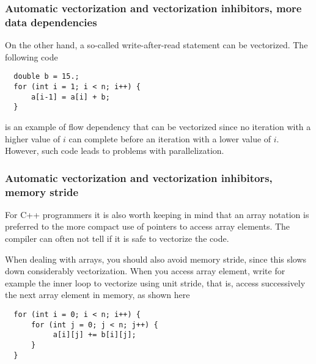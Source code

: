 \documentclass{beamer}
\begin{document}
\begin{frame}
\frametitle{Automatic vectorization and vectorization inhibitors, more data dependencies}

On the other hand,  a so-called 
write-after-read statement can be vectorized. The following code
\begin{verbatim}
  double b = 15.;
  for (int i = 1; i < n; i++) {
      a[i-1] = a[i] + b;
  }
\end{verbatim}
is an example of flow dependency that can be vectorized since no iteration with a higher value of $i$
can complete before an iteration with a lower value of $i$. However, such code leads to problems with parallelization.
\end{frame}

\begin{frame}
\frametitle{Automatic vectorization and vectorization inhibitors, memory stride}

For C++ programmers  it is also worth keeping in mind that an array notation is preferred to the more compact use of pointers to access array elements. The compiler can often not tell if it is safe to vectorize the code. 

When dealing with arrays, you should also avoid memory stride, since this slows down considerably vectorization. When you access array element, write for example the inner loop to vectorize using unit stride, that is, access successively the next array element in memory, as shown here
\begin{verbatim}
  for (int i = 0; i < n; i++) {
      for (int j = 0; j < n; j++) {
           a[i][j] += b[i][j];
      }  
  }
\end{verbatim}
\end{frame}
\end{document}
